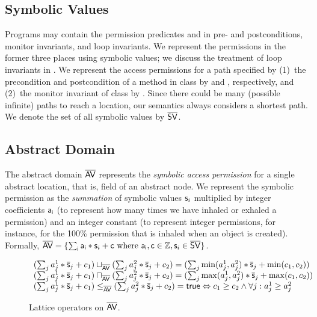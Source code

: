 \documentclass{llncs}
\begin{document}
\goup
\subsection{Symbolic Values}
\goup

Programs may contain the permission predicates  and
 in pre- and postconditions, monitor invariants, and
loop invariants. We represent the permissions in the former three
places using symbolic values; we discuss the treatment of loop
invariants in . We represent the access
permissions for a path  specified by (1)~the
precondition and postcondition of a method  in class
 by  and ,
respectively, and (2)~the monitor invariant of class  by
. Since there could be many (possible infinite) paths to
reach a location, our semantics always considers a shortest path.
We denote the set of all symbolic values by $\mathsf{\overline{SV}}$.


\goup
\subsection{Abstract Domain}
\goup 

The abstract domain $\mathsf{\overline{AV}}$ represents the \emph{symbolic access
  permission} for a single abstract location, that is, field of an
abstract node. We represent the symbolic permission as the
\emph{summation} of symbolic values $\mathsf{s}_i$ multiplied by
integer coefficients $\mathsf{a_i}$ (to represent how many times we have
inhaled or exhaled a permission) and an integer constant  (to
represent integer permissions, for instance, for the 100\% permission
that is inhaled when an object is created).  Formally,
$\mathsf{\overline{AV}}=\{\sum_{\mathsf{i}} \mathsf{a_i} * \mathsf{s}_i + \mathsf{c}
\mbox{\ where\ } \mathsf{a_i}, \mathsf{c} \in \mathbb{Z},
\mathsf{s}_i \in \mathsf{\overline{SV}} \}$.

\begin{figure}
\goup
\goup
\goup
\scriptsize
$
\begin{array}{l}
(\sum_j a^1_j * \mathsf{\overline{s}}_j + c_1) \sqcup_{\mathsf{\overline{AV}}} (\sum_j a^2_j * \mathsf{\overline{s}}_j + c_2) = (\sum_j \min(a^1_j, a^2_j) * \mathsf{\overline{s}}_j + \min(c_1, c_2))\\
(\sum_j a^1_j * \mathsf{\overline{s}}_j + c_1) \sqcap_{\mathsf{\overline{AV}}} (\sum_j a^2_j * \mathsf{\overline{s}}_j + c_2) = (\sum_j \max(a^1_j, a^2_j) * \mathsf{\overline{s}}_j + \max(c_1, c_2))\\
(\sum_j a^1_j * \mathsf{\overline{s}}_j + c_1) \leq_{\mathsf{\overline{AV}}} (\sum_j a^2_j * \mathsf{\overline{s}}_j + c_2) = \mathsf{true} \Leftrightarrow c_1 \geq c_2 \land \forall j : a^1_j \geq a^2_j\\
\end{array}
$
\normalsize
\goup
\caption{Lattice operators on $\mathsf{\overline{AV}}$.}
\label{fig:latticeoperators}
\goup
\goup
\goup
\end{figure}
\end{document}
